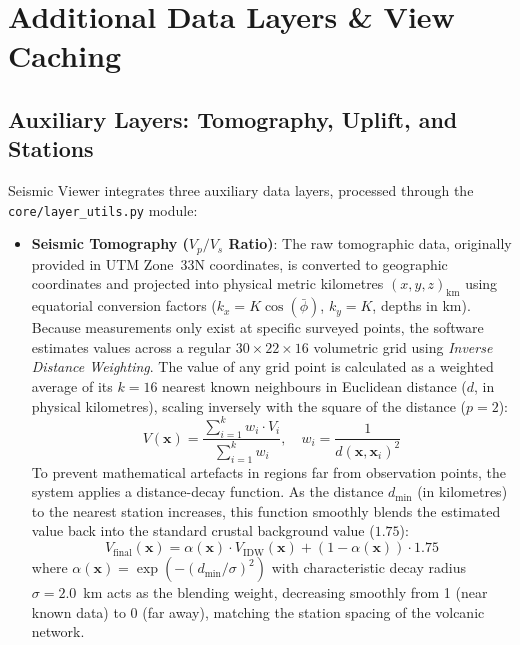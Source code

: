 \section{Additional Data Layers \& View Caching}
\label{sec:additional-layers}

\subsection{Auxiliary Layers: Tomography, Uplift, and Stations}
\label{sec:tomography}
\label{sec:uplift}
\label{sec:stations}

Seismic Viewer integrates three auxiliary data layers, processed through the \texttt{core/\allowbreak layer\_utils.py} module:
\begin{itemize}
    \item \textbf{Seismic Tomography ($V_p/V_s$ Ratio)}: The raw tomographic data, originally provided in UTM Zone~33N coordinates, is converted to geographic coordinates and projected into physical metric kilometres $(x, y, z)_\text{km}$ using equatorial conversion factors ($k_x = K \cos(\bar{\phi})$, $k_y = K$, depths in km). Because measurements only exist at specific surveyed points, the software estimates values across a regular $30 \times 22 \times 16$ volumetric grid using \textit{Inverse Distance Weighting}. The value of any grid point is calculated as a weighted average of its $k=16$ nearest known neighbours in Euclidean distance ($d$, in physical kilometres), scaling inversely with the square of the distance ($p=2$):
    \begin{equation}
        V(\mathbf{x}) = \frac{\sum_{i=1}^{k} w_i \cdot V_i}{\sum_{i=1}^{k} w_i}, \quad w_i = \frac{1}{d(\mathbf{x}, \mathbf{x}_i)^2}
        \label{eq:idw}
    \end{equation}
    To prevent mathematical artefacts in regions far from observation points, the system applies a distance-decay function. As the distance $d_\text{min}$ (in kilometres) to the nearest station increases, this function smoothly blends the estimated value back into the standard crustal background value ($1.75$):
    \begin{equation}
        V_\text{final}(\mathbf{x}) = \alpha(\mathbf{x}) \cdot V_\text{IDW}(\mathbf{x}) + (1 - \alpha(\mathbf{x})) \cdot 1.75
        \label{eq:gaussian-damping}
    \end{equation}
    where $\alpha(\mathbf{x}) = \exp(-(d_\text{min}/\sigma)^2)$ with characteristic decay radius $\sigma = 2.0$~km acts as the blending weight, decreasing smoothly from 1 (near known data) to 0 (far away), matching the station spacing of the volcanic network.

\end{itemize}
